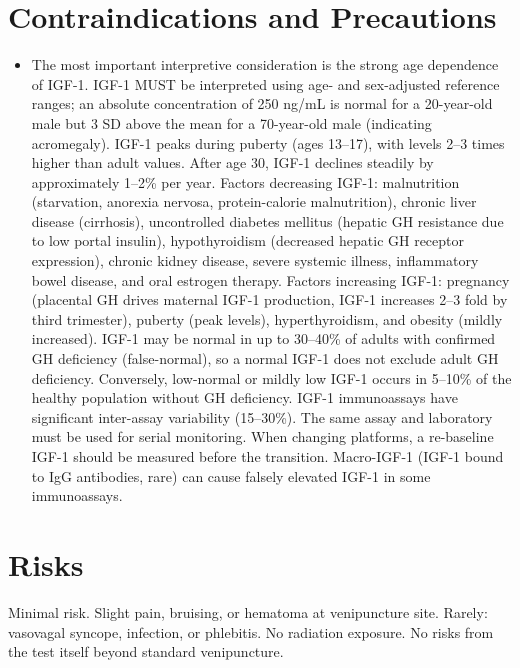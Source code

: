 \section*{Contraindications and Precautions}
\begin{itemize}
  \item The most important interpretive consideration is the strong age dependence of IGF-1. IGF-1 MUST be interpreted using age- and sex-adjusted reference ranges; an absolute concentration of 250 ng/mL is normal for a 20-year-old male but 3 SD above the mean for a 70-year-old male (indicating acromegaly). IGF-1 peaks during puberty (ages 13--17), with levels 2--3 times higher than adult values. After age 30, IGF-1 declines steadily by approximately 1--2\% per year. Factors decreasing IGF-1: malnutrition (starvation, anorexia nervosa, protein-calorie malnutrition), chronic liver disease (cirrhosis), uncontrolled diabetes mellitus (hepatic GH resistance due to low portal insulin), hypothyroidism (decreased hepatic GH receptor expression), chronic kidney disease, severe systemic illness, inflammatory bowel disease, and oral estrogen therapy. Factors increasing IGF-1: pregnancy (placental GH drives maternal IGF-1 production, IGF-1 increases 2--3 fold by third trimester), puberty (peak levels), hyperthyroidism, and obesity (mildly increased). IGF-1 may be normal in up to 30--40\% of adults with confirmed GH deficiency (false-normal), so a normal IGF-1 does not exclude adult GH deficiency. Conversely, low-normal or mildly low IGF-1 occurs in 5--10\% of the healthy population without GH deficiency. IGF-1 immunoassays have significant inter-assay variability (15--30\%). The same assay and laboratory must be used for serial monitoring. When changing platforms, a re-baseline IGF-1 should be measured before the transition. Macro-IGF-1 (IGF-1 bound to IgG antibodies, rare) can cause falsely elevated IGF-1 in some immunoassays.
\end{itemize}
\section*{Risks}
Minimal risk. Slight pain, bruising, or hematoma at venipuncture site. Rarely: vasovagal syncope, infection, or phlebitis. No radiation exposure. No risks from the test itself beyond standard venipuncture.

